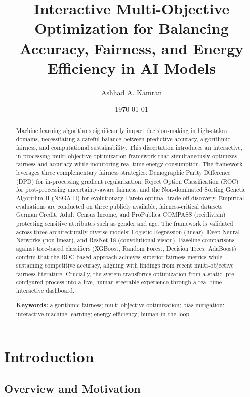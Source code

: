 \documentclass[12pt,a4paper]{article}
\title{Interactive Multi-Objective Optimization for Balancing Accuracy, Fairness, and Energy Efficiency in AI Models}
\author{Ashhad A. Kamran}
\date{\today}
\begin{document}
\maketitle
\newpage
\begin{abstract}
Machine learning algorithms significantly impact decision-making in high-stakes domains, necessitating a careful balance between predictive accuracy, algorithmic fairness, and computational sustainability. This dissertation introduces an interactive, in-processing multi-objective optimization framework that simultaneously optimizes fairness and accuracy while monitoring real-time energy consumption. The framework leverages three complementary fairness strategies: Demographic Parity Difference (DPD) for in-processing gradient regularization, Reject Option Classification (ROC) for post-processing uncertainty-aware fairness, and the Non-dominated Sorting Genetic Algorithm II (NSGA-II) for evolutionary Pareto-optimal trade-off discovery. Empirical evaluations are conducted on three publicly available, fairness-critical datasets -- German Credit, Adult Census Income, and ProPublica COMPASS (recidivism) -- protecting sensitive attributes such as gender and age. The framework is validated across three architecturally diverse models: Logistic Regression (linear), Deep Neural Networks (non-linear), and ResNet-18 (convolutional vision). Baseline comparisons against tree-based classifiers (XGBoost, Random Forest, Decision Trees, AdaBoost) confirm that the ROC-based approach achieves superior fairness metrics while sustaining competitive accuracy, aligning with findings from recent multi-objective fairness literature. Crucially, the system transforms optimization from a static, pre-configured process into a live, human-steerable experience through a real-time interactive dashboard.

\noindent\textbf{Keywords:} algorithmic fairness; multi-objective optimization; bias mitigation; interactive machine learning; energy efficiency; human-in-the-loop
\end{abstract}
\newpage
\tableofcontents
\newpage

\section{Introduction}

\subsection{Overview and Motivation}
\end{document}
